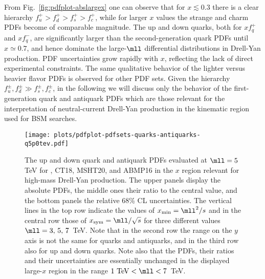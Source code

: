    From Fig.~\ref{fig:pdfplot-abslargex} one can observe that for
   $x\lesssim 0.3$ there is a clear hierarchy
$f_u^+>f_d^+ >f_s^+>f_c^+$, while for larger $x$ values the
   strange and charm PDFs become of comparable magnitude.
   The up and down quarks, both for $xf^+_q$ and $xf^-_q$, are significantly larger
   than the second-generation quark PDFs until $x\simeq 0.7$, and hence dominate the
   large-$\mll$ differential distributions in Drell-Yan production.
%
PDF uncertainties grow rapidly with $x$, reflecting the lack
of direct experimental constraints.
%
The same qualitative behavior of the lighter versus heavier flavor PDFs
is observed for other PDF sets.
%
Given the hierarchy $f_u^\pm, f_d^\pm \gg f_s^\pm, f_c^\pm $, in the following
we will discuss only the behavior of the first-generation quark
and antiquark PDFs which are those relevant for the interpretation
of neutral-current Drell-Yan production in the kinematic region used
for BSM searches. 
      


\begin{figure}[!t]
 \centering
 \texttt{[image: plots/pdfplot-pdfsets-quarks-antiquarks-q5p0tev.pdf]}
 \caption{\small The up and down quark and antiquark PDFs evaluated at $\mll=5$ TeV
   for , CT18, MSHT20, and ABMP16 in the $x$ region relevant for
   high-mass Drell-Yan production. The upper panels display the absolute PDFs,
   the middle ones their ratio to the central  value, and the bottom panels
   the relative 68\% CL uncertainties.
   The vertical lines in the top
   row indicate the values of  $x_{\rm min}=\mll^2/s$ and in the central
   row those of $x_{\rm  sym}=\mll/\sqrt{s}$
   for three
   different values  $\mll=3,\,5,\,7$~TeV.
   Note that in the second row the
   range on the $y$ axis is not the same for quarks and antiquarks,
   and in the third row also for up and down quarks.
   Note also that the
   PDFs, their ratios and their uncertainties are essentially
   unchanged in the displayed large-$x$ region in the range $1~{\rm TeV}<\mll<7$~TeV.
}    
 \label{fig:mll_dep_pdfs}
\end{figure}


